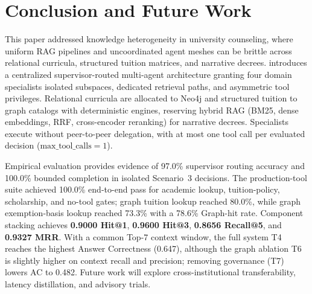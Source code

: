 \section{Conclusion and Future Work}
\label{sec:conclusion}

This paper addressed knowledge heterogeneity in university counseling, where uniform RAG pipelines and uncoordinated agent meshes can be brittle across relational curricula, structured tuition matrices, and narrative decrees. \system{} introduces a centralized supervisor-routed multi-agent architecture granting four domain specialists isolated subspaces, dedicated retrieval paths, and asymmetric tool privileges. Relational curricula are allocated to Neo4j and structured tuition to graph catalogs with deterministic engines, reserving hybrid RAG (BM25, dense embeddings, RRF, cross-encoder reranking) for narrative decrees. Specialists execute without peer-to-peer delegation, with at most one tool call per evaluated decision ($\text{max\_tool\_calls}=1$).

Empirical evaluation provides evidence of 97.0\% supervisor routing accuracy and 100.0\% bounded completion in isolated Scenario~3 decisions. The production-tool suite achieved 100.0\% end-to-end pass for academic lookup, tuition-policy, scholarship, and no-tool gates; graph tuition lookup reached 80.0\%, while graph exemption-basis lookup reached 73.3\% with a 78.6\% Graph-hit rate. Component stacking achieves \textbf{0.9000 Hit@1}, \textbf{0.9600 Hit@3}, \textbf{0.8656 Recall@5}, and \textbf{0.9327 MRR}. With a common Top-7 context window, the full system T4 reaches the highest Answer Correctness (0.647), although the graph ablation T6 is slightly higher on context recall and precision; removing governance (T7) lowers AC to 0.482. Future work will explore cross-institutional transferability, latency distillation, and advisory trials.
